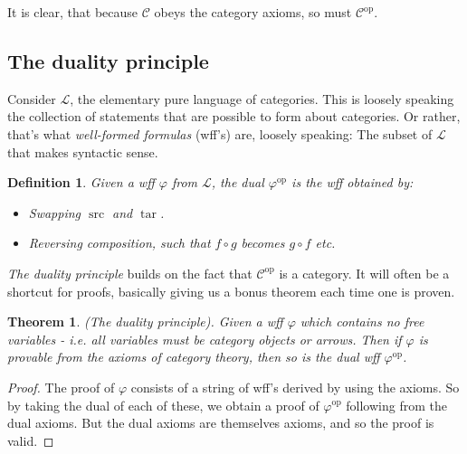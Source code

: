 \documentclass[12pt, a4paper]{article}
\newtheorem{theorem}{Theorem}[section]
\newtheorem{definition}{Definition}[section]
\numberwithin{equation}{section}
\DeclareMathOperator{\src}{src}
\DeclareMathOperator{\tar}{tar}
\begin{document}
It is clear, that because $\mathcal{C}$ obeys the category axioms, so must $\mathcal{C}^{\textrm{op}}$.

\subsection{The duality principle}
Consider $\mathcal{L}$, the elementary pure language of categories. This is loosely speaking the collection of statements that are possible to form about categories. Or rather, that's what \textit{well-formed formulas} (wff's) are, loosely speaking: The subset of $\mathcal{L}$ that makes syntactic sense.

\begin{definition}
Given a wff $\varphi$ from $\mathcal{L}$, the dual $\varphi^{\textrm{op}}$ is the wff obtained by:
\begin{itemize}
\item Swapping $\src$ and $\tar$.
\item Reversing composition, such that $f\circ g$ becomes $g\circ f$ etc.
\end{itemize}
\end{definition}

\textit{The duality principle} builds on the fact that $\mathcal{C}^{\textrm{op}}$ is a category. It will often be a shortcut for proofs, basically giving us a bonus theorem each time one is proven.

\begin{theorem}
(The duality principle). Given a wff $\varphi$ which contains no free variables - i.e. all variables must be category objects or arrows. Then if $\varphi$ is provable from the axioms of category theory, then so is the dual wff $\varphi^{\textrm{op}}$.
\end{theorem}
\begin{proof}
The proof of $\varphi$ consists of a string of wff's derived by using the axioms. So by taking the dual of each of these, we obtain a proof of $\varphi^{\textrm{op}}$ following from the dual axioms. But the dual axioms are themselves axioms, and so the proof is valid.
\end{proof}
\end{document}
